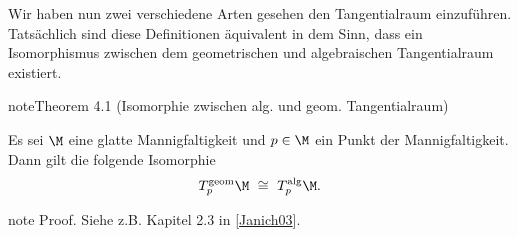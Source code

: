 \documentclass[letterpaper,10pt,english]{jupyterBook}
\begin{document}
\sphinxAtStartPar
Wir haben nun zwei verschiedene Arten gesehen den Tangentialraum einzuführen.
Tatsächlich sind diese Definitionen äquivalent in dem Sinn, dass ein Isomorphismus zwischen dem geometrischen und algebraischen Tangentialraum existiert.
\label{manifolds/tangential:theorem-11}
\begin{sphinxadmonition}{note}{Theorem 4.1 (Isomorphie zwischen alg. und geom. Tangentialraum)}



\sphinxAtStartPar
Es sei \(\M\) eine glatte Mannigfaltigkeit und \(p\in\M\) ein Punkt der Mannigfaltigkeit.
Dann gilt die folgende Isomorphie
\begin{equation*}
\begin{split}T^{\text{geom}}_p\M \ \cong \ T^{\text{alg}}_p\M.\end{split}
\end{equation*}\end{sphinxadmonition}

\begin{sphinxadmonition}{note}
\sphinxAtStartPar
Proof. Siehe z.B. Kapitel 2.3 in {[}\hyperlink{cite.references:id14}{Janich03}{]}.
\end{sphinxadmonition}
\end{document}
